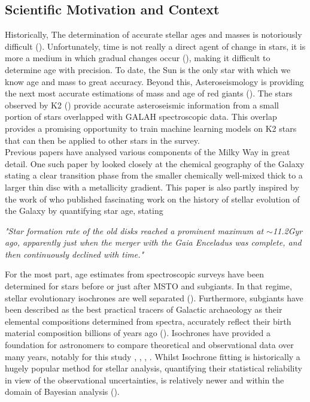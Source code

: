 \documentclass[fleqn,usenatbib]{mnras}
\begin{document}
\subsection{Scientific Motivation and Context} \label{sec:intro_motivation}
Historically, The determination of accurate stellar ages and masses is notoriously difficult (\citet{linetal2018}). Unfortunately, time is not really a direct agent of change in stars, it is more a medium in which gradual changes occur (\citet{Soderblom2010}), making it difficult to determine age with precision. To date, the Sun is the only star with which we know age and mass to great accuracy. Beyond this, Asteroseismology is providing the next most accurate estimations of mass and age of red giants (\citet{Ness_2016}). The stars observed by K2 (\citet{2014Howell}) provide accurate asteroseismic information from a small portion of stars overlapped with GALAH spectroscopic data. This overlap provides a promising opportunity to train machine learning models on K2 stars that can then be applied to other stars in the survey.
\\
Previous papers have analysed various components of the Milky Way in great detail. One such paper by \citet{ciuca2021} looked closely at the chemical geography of the Galaxy stating a clear transition phase from the smaller chemically well-mixed thick to a larger thin disc with a metallicity gradient. This paper is also partly inspired by the work of \citet{2022Natur} who published fascinating work on the history of stellar evolution of the Galaxy by quantifying star age, stating
\\
\begin{adjustwidth}{1cm}{}
    \textit {"Star formation rate of the old disks reached a prominent maximum at \(\sim\)11.2Gyr ago, apparently just when the merger with the Gaia Enceladus was complete, and then continuously declined with time."\newline}
\end{adjustwidth} 

For the most part, age estimates from spectroscopic surveys have been determined for stars before or just after MSTO and subgiants. In that regime, stellar evolutionary isochrones are well separated (\citet{Ness_2016}). Furthermore, subgiants have been described as the best practical tracers of Galactic archaeology as their elemental compositions determined from spectra, accurately reflect their birth material composition billions of years ago (\citet{2022Natur}). Isochrones have provided a foundation for astronomers to compare theoretical and observational data over many years, notably for this study \citet{linetal2018}, \citet{2022Natur}, \citet{ciuca2021}, \citet{Jorgensen2005}. Whilst Isochrone fitting is historically a hugely popular method for stellar analysis, quantifying their statistical reliability in view of the observational uncertainties, is relatively newer and within the domain of Bayesian analysis (\citet{Jorgensen2005}). 
\end{document}
